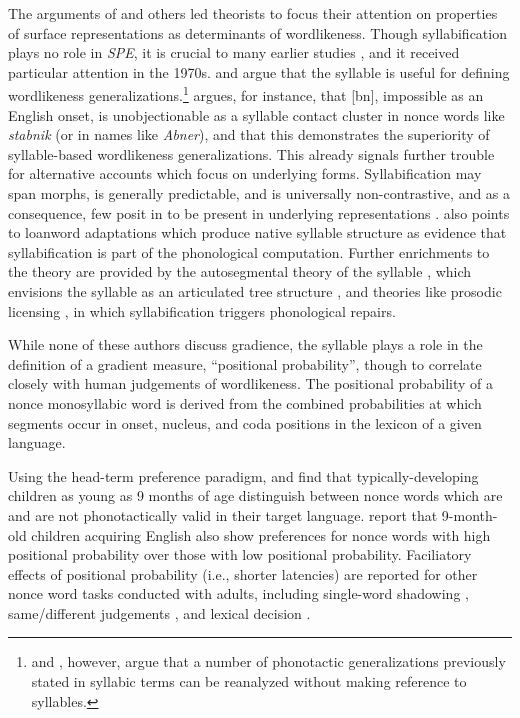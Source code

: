 The arguments of \citeauthor{Shibatani1973} and others led theorists to focus their attention on properties of surface representations as determinants of wordlikeness. Though syllabification plays no role in \emph{SPE}, it is crucial to many earlier studies \citep[see][]{Goldsmith2011b}, and it received particular attention in the 1970s. \citet{Hooper1973} and \citet{Kahn1976} argue that the syllable is useful for defining wordlikeness generalizations.\footnote{\citet{Steriade1999} and \citet{Blevins2003}, however, argue that a number of phonotactic generalizations previously stated in syllabic terms can be reanalyzed without making reference to syllables.} \citeauthor{Hooper1973} argues, for instance, that [bn], impossible as an English onset, is unobjectionable as a syllable contact cluster in nonce words like \emph{stabnik} (or in names like \emph{Abner}), and that this demonstrates the superiority of syllable-based wordlikeness generalizations. This already signals further trouble for alternative accounts which focus on underlying forms. Syllabification may span morphs, is generally predictable, and is universally non-contrastive, and as a consequence, few posit in to be present in underlying representations \citep[though see, e.g.,][]{Vaux2003}. \citeauthor{Hooper1973} also points to loanword adaptations which produce native syllable structure \citep[e.g.,][]{Carlisle1991} as evidence that syllabification is part of the phonological computation. Further enrichments to the theory are provided by the autosegmental theory of the syllable \citep{McCarthy1979b}, which envisions the syllable as an articulated tree structure \citep[as envisioned by][]{Pike1947a}, and theories like prosodic licensing \citep{Ito1989a}, in which syllabification triggers phonological repairs.

While none of these authors discuss gradience, the syllable plays a role in the definition of a gradient measure, ``positional probability'', though to correlate closely with human judgements of wordlikeness. The positional probability of a nonce monosyllabic word is derived from the combined probabilities at which segments occur in onset, nucleus, and coda positions in the lexicon of a given language. 

Using the head-term preference paradigm, \citet{Jusczyk1993b} and \citet{Friederici1993} find that typically-developing children as young as 9 months of age distinguish between nonce words which are and are not phonotactically valid in their target language. \citet{Jusczyk1994} report that 9-month-old children acquiring English also show preferences for nonce words with high positional probability over those with low positional probability. Faciliatory effects of positional probability (i.e., shorter latencies) are reported for other nonce word tasks conducted with adults, including single-word shadowing \citep{Vitevitch1997,Vitevitch1998}, same/different judgements \citep{Vitevitch1999a,Luce2001,Lipinski2005,Vitevitch2005}, and lexical decision \citep{Pylkkanen2002a}.


